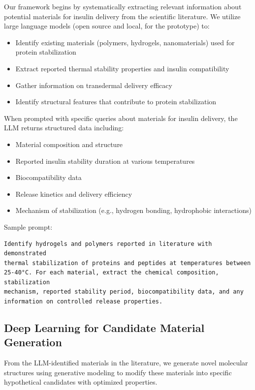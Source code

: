 \documentclass[11pt,a4paper]{article}
\begin{document}
Our framework begins by systematically extracting relevant information about potential materials for insulin delivery from the scientific literature. We utilize large language models (open source and local, for the prototype) to:

\begin{itemize}
    \item Identify existing materials (polymers, hydrogels, nanomaterials) used for protein stabilization
    \item Extract reported thermal stability properties and insulin compatibility
    \item Gather information on transdermal delivery efficacy
    \item Identify structural features that contribute to protein stabilization
\end{itemize}

When prompted with specific queries about materials for insulin delivery, the LLM returns structured data including:

\begin{itemize}
    \item Material composition and structure
    \item Reported insulin stability duration at various temperatures
    \item Biocompatibility data
    \item Release kinetics and delivery efficiency
    \item Mechanism of stabilization (e.g., hydrogen bonding, hydrophobic interactions)
\end{itemize}

Sample prompt:

\begin{lstlisting}
Identify hydrogels and polymers reported in literature with demonstrated 
thermal stabilization of proteins and peptides at temperatures between 
25-40°C. For each material, extract the chemical composition, stabilization 
mechanism, reported stability period, biocompatibility data, and any 
information on controlled release properties.
\end{lstlisting}

\subsection{Deep Learning for Candidate Material Generation}

From the LLM-identified materials in the literature, we generate novel molecular structures using generative modeling to modify these materials into specific hypothetical candidates with optimized properties.
\end{document}
